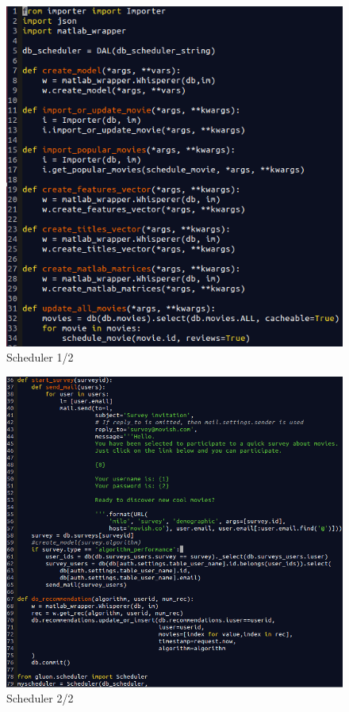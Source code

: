 \begin{figure}
  \centering
  \includegraphics[width=\textwidth]{figures/scheduler1.png}
  \caption{Scheduler 1/2}
  \label{fig:scheduler1}
\end{figure}

\begin{figure}
  \centering
  \includegraphics[width=\textwidth]{figures/scheduler2.png}
  \caption{Scheduler 2/2}
  \label{fig:scheduler2}
\end{figure}

